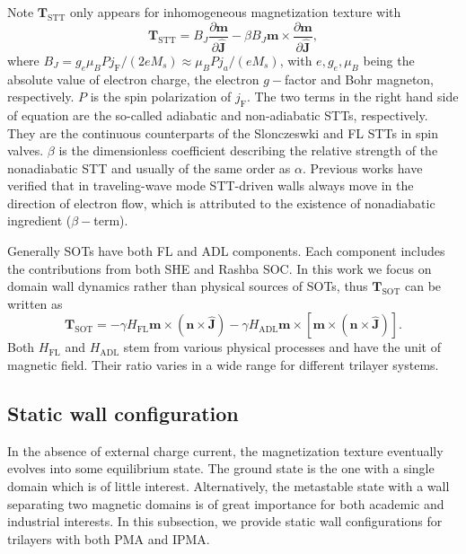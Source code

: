 \documentclass[12pt]{iopart}
\begin{document}
Note $\mathbf{T}_{\mathrm{STT}}$ only appears for inhomogeneous magnetization texture with\cite{SZhang_PRL_2004a,SZhang_PRL_2004b}
\begin{equation}\label{SST_trilayer}
\mathbf{T}_{\mathrm{STT}}=B_J\frac{\partial\mathbf{m}}{\partial \hat{\mathbf{J}}}-\beta B_J\mathbf{m}\times\frac{\partial\mathbf{m}}{\partial \hat{\mathbf{J}}},
\end{equation}
where $B_J=g_e\mu_B P j_{\mathrm{F}} /(2e M_s)\approx \mu_B P j_a/(e M_s)$, with $e,g_e,\mu_B$ being the absolute value of electron charge,
the electron $g-$factor and Bohr magneton, respectively.
$P$ is the spin polarization of $j_{\mathrm{F}}$.
The two terms in the right hand side of equation  are the so-called adiabatic 
and non-adiabatic STTs, respectively.
They are the continuous counterparts of the Slonczeswki\cite{Slonczewski_JMMM_1996} and FL STTs in spin valves.
$\beta$ is the dimensionless coefficient
describing the relative strength of the nonadiabatic STT and usually of the same order as $\alpha$.
Previous works have verified that in traveling-wave mode STT-driven walls always move in the direction
of electron flow, which is attributed to the existence of nonadiabatic ingredient ($\beta-$term).

Generally SOTs have both FL and ADL components.
Each component includes the contributions from both SHE and Rashba SOC.
In this work we focus on domain wall dynamics rather than physical sources of SOTs,
thus $\mathbf{T}_{\mathrm{SOT}}$ can be written as
\begin{equation}\label{SOT_trilayer}
\mathbf{T}_{\mathrm{SOT}}=-\gamma H_{\mathrm{FL}}\mathbf{m}\times\left(\mathbf{n}\times\hat{\mathbf{J}}\right)
-\gamma H_{\mathrm{ADL}}\mathbf{m}\times\left[\mathbf{m}\times\left(\mathbf{n}\times\hat{\mathbf{J}}\right)\right].
\end{equation}
Both $H_{\mathrm{FL}}$ and $H_{\mathrm{ADL}}$ stem from various physical processes
and have the unit of magnetic field.
Their ratio varies in a wide range for different trilayer systems.


\subsection{Static wall configuration}\label{Modeling:StaticWall}
In the absence of external charge current, the magnetization texture
eventually evolves into some equilibrium state. The ground state
is the one with a single domain which is of little interest.
Alternatively, the metastable state with a wall separating
two magnetic domains is of great importance for both academic and
industrial interests. In this subsection, we provide
static wall configurations for trilayers with both PMA and IPMA.
\end{document}
